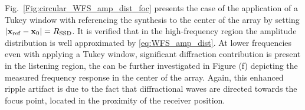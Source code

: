 \documentclass[lettersize,journal]{IEEEtran}
\begin{document}
Fig.~\ref{Fig:circular_WFS_amp_dist_foc} presents the case of the application of a Tukey window with referencing the synthesis to the center of the array by setting $|\mathbf{x}_{\mathrm{ref}}-\mathbf{x}_0| = R_{\mathrm{SSD}}$.
It is verified that in the high-frequency region the amplitude distribution is well approximated by \eqref{eq:WFS_amp_dist}.
At lower frequencies even with applying a Tukey window, significant diffraction contribution is present in the listening region, the can be further investigated in Figure (f) depicting the measured frequency response in the center of the array.
Again, this enhanced ripple artifact is due to the fact that diffractional waves are directed towards the focus point, located in the proximity of the receiver position.

\end{document}
